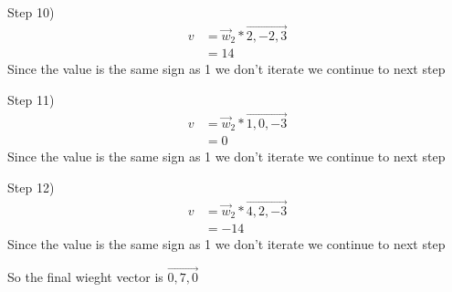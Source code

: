\documentclass[12pt,english]{article}
\begin{document}
Step 10)
\begin{equation*}
\begin{split}
v&= \vec{w}_2* \overrightarrow{2,-2,3}\\
&= 14
\end{split}
\end{equation*}
Since the value is the same sign as 1 we don't iterate we continue to next step\par

Step 11)
\begin{equation*}
\begin{split}
v&= \vec{w}_2* \overrightarrow{1,0,-3}\\
&= 0
\end{split}
\end{equation*}
Since the value is the same sign as 1 we don't iterate we continue to next step\par

Step 12)
\begin{equation*}
\begin{split}
v&= \vec{w}_2* \overrightarrow{4,2,-3}\\
&= -14
\end{split}
\end{equation*}
Since the value is the same sign as 1 we don't iterate we continue to next step\par
So the final wieght vector is $\overrightarrow{0,7,0}$
\end{document}
